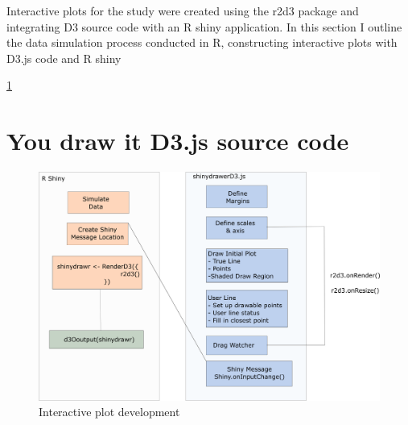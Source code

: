 \documentclass[print]{nuthesis}
\begin{document}
Interactive plots for the study were created using the r2d3 package and integrating D3 source code with an R shiny application.
In this section I outline the data simulation process conducted in R, constructing interactive plots with D3.js code and R shiny

\cref{fig:r2d3-shiny-flowchart}

\hypertarget{d3.js-source-code}{%
\section{You draw it D3.js source code}\label{d3.js-source-code}}

\begin{figure}[tbp]

{\centering \includegraphics[width=0.8\linewidth,]{images/r2d3+shiny-inkscape} 

}

\caption{Interactive plot development}\label{fig:r2d3-shiny-flowchart}
\end{figure}
\end{document}
